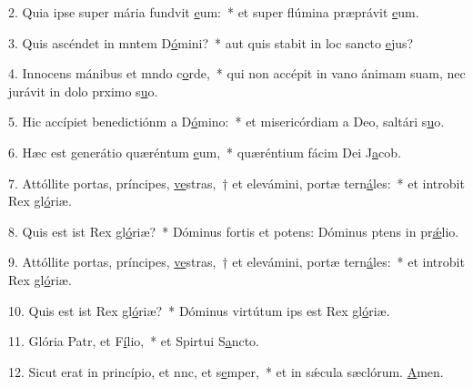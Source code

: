 2. Quia ipse super mária fundvit \uline{e}um:~* et super flúmina præprávit \uline{e}um.\par 
3. Quis ascéndet in mntem D\uline{ó}mini?~* aut quis stabit in loc sancto \uline{e}jus?\par 
4. Innocens mánibus et mndo c\uline{o}rde,~* qui non accépit in vano ánimam suam, nec jurávit in dolo prximo s\uline{u}o.\par 
5. Hic accípiet benedictiónm a D\uline{ó}mino:~* et misericórdiam a Deo, saltári s\uline{u}o.\par 
6. Hæc est generátio quæréntum \uline{e}um,~* quæréntium fácim Dei J\uline{a}cob.\par 
7. Attóllite portas, príncipes, \uline{ve}stras,~† et elevámini, portæ tern\uline{á}les:~* et introbit Rex gl\uline{ó}riæ.\par 
8. Quis est ist Rex gl\uline{ó}riæ?~* Dóminus fortis et potens: Dóminus ptens in pr\uline{ǽ}lio.\par 
9. Attóllite portas, príncipes, \uline{ve}stras,~† et elevámini, portæ tern\uline{á}les:~* et introbit Rex gl\uline{ó}riæ.\par 
10. Quis est ist Rex gl\uline{ó}riæ?~* Dóminus virtútum ips est Rex gl\uline{ó}riæ.\par 
11. Glória Patr, et F\uline{í}lio,~* et Spirtui S\uline{a}ncto.\par 
12. Sicut erat in princípio, et nnc, et s\uline{e}mper,~* et in sǽcula sæclórum. \uline{A}men.\par 
